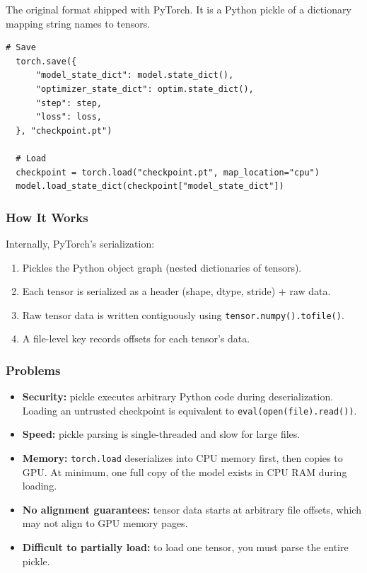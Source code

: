 \documentclass[11pt,a4paper]{article}
\theoremstyle{definition}
\begin{document}
The original format shipped with PyTorch. It is a Python pickle of a dictionary mapping string names to tensors.

\begin{lstlisting}[caption=Saving and loading in PyTorch]
  # Save
  torch.save({
      "model_state_dict": model.state_dict(),
      "optimizer_state_dict": optim.state_dict(),
      "step": step,
      "loss": loss,
  }, "checkpoint.pt")

  # Load
  checkpoint = torch.load("checkpoint.pt", map_location="cpu")
  model.load_state_dict(checkpoint["model_state_dict"])
\end{lstlisting}

\subsubsection{How It Works}

Internally, PyTorch's serialization:
\begin{enumerate}
	\item Pickles the Python object graph (nested dictionaries of tensors).
	\item Each tensor is serialized as a header (shape, dtype, stride) + raw data.
	\item Raw tensor data is written contiguously using \texttt{tensor.numpy().tofile()}.
	\item A file-level key records offsets for each tensor's data.
\end{enumerate}

\subsubsection{Problems}

\begin{itemize}
	\item \textbf{Security:} pickle executes arbitrary Python code during deserialization. Loading an untrusted checkpoint is equivalent to \texttt{eval(open(file).read())}.
	\item \textbf{Speed:} pickle parsing is single-threaded and slow for large files.
	\item \textbf{Memory:} \texttt{torch.load} deserializes into CPU memory first, then copies to GPU. At minimum, one full copy of the model exists in CPU RAM during loading.
	\item \textbf{No alignment guarantees:} tensor data starts at arbitrary file offsets, which may not align to GPU memory pages.
	\item \textbf{Difficult to partially load:} to load one tensor, you must parse the entire pickle.
\end{itemize}
\end{document}
